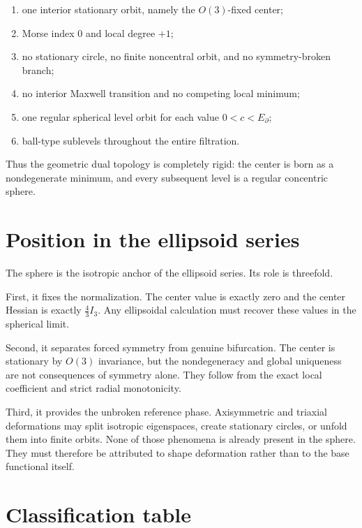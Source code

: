 \documentclass[11pt]{article}
\theoremstyle{definition}
\begin{document}
\begin{enumerate}[label=(\alph*)]
\item one interior stationary orbit, namely the $O(3)$-fixed center;
\item Morse index $0$ and local degree $+1$;
\item no stationary circle, no finite noncentral orbit, and no symmetry-broken branch;
\item no interior Maxwell transition and no competing local minimum;
\item one regular spherical level orbit for each value $0<c<E_\partial$;
\item ball-type sublevels throughout the entire filtration.
\end{enumerate}

Thus the geometric dual topology is completely rigid: the center is born as a nondegenerate minimum, and every subsequent level is a regular concentric sphere.

\section{Position in the ellipsoid series}

The sphere is the isotropic anchor of the ellipsoid series.  Its role is threefold.

First, it fixes the normalization.  The center value is exactly zero and the center Hessian is exactly $\frac43I_3$.  Any ellipsoidal calculation must recover these values in the spherical limit.

Second, it separates forced symmetry from genuine bifurcation.  The center is stationary by $O(3)$ invariance, but the nondegeneracy and global uniqueness are not consequences of symmetry alone.  They follow from the exact local coefficient and strict radial monotonicity.

Third, it provides the unbroken reference phase.  Axisymmetric and triaxial deformations may split isotropic eigenspaces, create stationary circles, or unfold them into finite orbits.  None of those phenomena is already present in the sphere.  They must therefore be attributed to shape deformation rather than to the base functional itself.

\section{Classification table}
\end{document}
